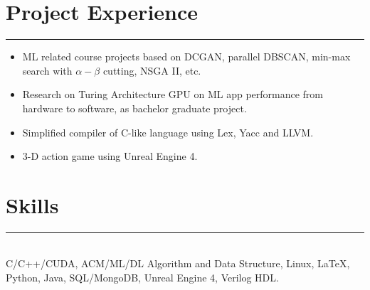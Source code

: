\documentclass[a4paper]{article}
\begin{document}
		\section*{Project Experience}
		\rule[1pt]{18cm}{0.01em}
		\begin{itemize}
		\item ML related course projects based on DCGAN, parallel DBSCAN, min-max search with $ \alpha-\beta $ cutting, NSGA II, etc. 
		\item Research on Turing Architecture GPU on ML app performance from hardware to software, as bachelor graduate project.
		\item Simplified compiler of C-like language using Lex, Yacc and LLVM. 
		\item 3-D action game using Unreal Engine 4.
		\end{itemize}
		\section*{Skills}
		\rule[1pt]{18cm}{0.01em}\\
		C/C++/CUDA, ACM/ML/DL Algorithm and Data Structure, Linux, \LaTeX, Python, Java, SQL/MongoDB, Unreal Engine 4, Verilog HDL.
		
	
\end{document}
